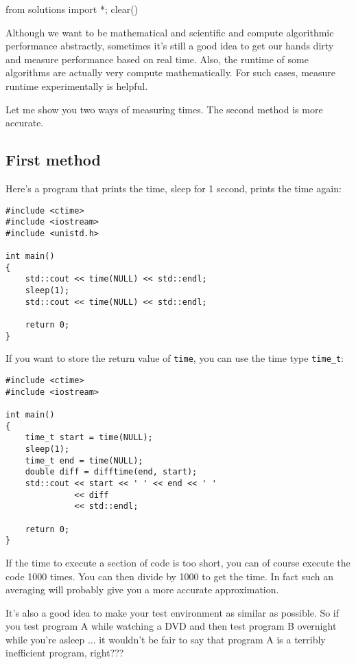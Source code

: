 \begin{python0}
from solutions import *; clear()
\end{python0}


Although we want to be mathematical and scientific and
compute algorithmic
performance abstractly, sometimes it's still a good idea to
get our hands dirty and measure performance based on real time.
Also, the runtime of some algorithms are actually very compute
mathematically.
For such cases, measure runtime experimentally is helpful.

Let me show you two ways of measuring times.
The second method is more accurate.


\subsection{First method}

Here's a program that prints the time, sleep for 1 second, prints the time
again:
\begin{Verbatim}[frame=single,fontsize=\footnotesize]
#include <ctime>
#include <iostream> 
#include <unistd.h>
  
int main()
{
    std::cout << time(NULL) << std::endl;
    sleep(1);
    std::cout << time(NULL) << std::endl;

    return 0;
}
\end{Verbatim}
If you want to store the return value of \verb!time!, you can use
the time type \verb!time_t!:
\begin{Verbatim}[frame=single,fontsize=\footnotesize]
#include <ctime>
#include <iostream>

int main()
{
    time_t start = time(NULL);
    sleep(1);
    time_t end = time(NULL);
    double diff = difftime(end, start);
    std::cout << start << ' ' << end << ' ' 
              << diff
              << std::endl;

    return 0;
}
\end{Verbatim}

If the time to execute a section of code is too short, you can 
of course execute the code 1000 times.
You can then divide by 1000 to get the time.
In fact such an averaging will probably give you a more accurate
approximation.

It's also a good idea to make your test environment as similar as possible.
So if you test program A while watching a DVD and then test 
program B overnight while
you're asleep ... it wouldn't be fair to say that program A is a terribly
inefficient program, right???

